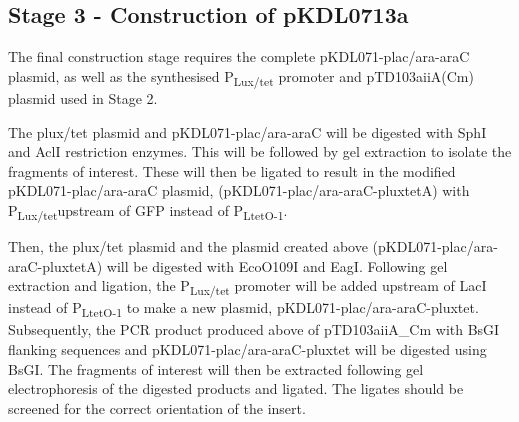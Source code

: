 \subsection{Stage 3 - Construction of pKDL0713a}

The final construction stage requires the complete pKDL071-plac/ara-araC plasmid, as well as the synthesised P\textsubscript{Lux/tet} promoter and pTD103aiiA(Cm) plasmid used in Stage 2. 

 The plux/tet plasmid and pKDL071-plac/ara-araC will be digested with SphI and AclI restriction enzymes. This will be followed by gel extraction to isolate the fragments of interest. These will then be ligated to result in the modified pKDL071-plac/ara-araC plasmid, (pKDL071-plac/ara-araC-pluxtetA) with P\textsubscript{Lux/tet}upstream of GFP instead of P\textsubscript{LtetO-1}.
 
Then, the plux/tet plasmid and the plasmid created above (pKDL071-plac/ara-araC-pluxtetA) will be digested with EcoO109I and EagI. Following gel extraction and ligation, the P\textsubscript{Lux/tet} promoter will be added upstream of LacI instead of P\textsubscript{LtetO-1} to make a new plasmid, pKDL071-plac/ara-araC-pluxtet. Subsequently, the PCR product produced above of pTD103aiiA\_Cm with BsGI flanking sequences and pKDL071-plac/ara-araC-pluxtet will be digested using BsGI. The fragments of interest will then be extracted following gel electrophoresis of the digested products and ligated. The ligates should be screened for the correct orientation of the insert. 


